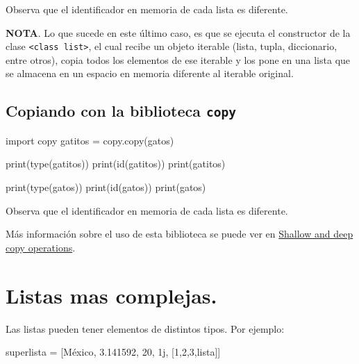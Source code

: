\documentclass[
  letterpaper,
  DIV=11,
  numbers=noendperiod]{scrreprt}
\newenvironment{Shaded}{\begin{snugshade}}{\end{snugshade}}
\newcommand{\BuiltInTok}[1]{\textcolor[rgb]{0.00,0.23,0.31}{#1}}
\newcommand{\DecValTok}[1]{\textcolor[rgb]{0.68,0.00,0.00}{#1}}
\newcommand{\FloatTok}[1]{\textcolor[rgb]{0.68,0.00,0.00}{#1}}
\newcommand{\ImportTok}[1]{\textcolor[rgb]{0.00,0.46,0.62}{#1}}
\newcommand{\NormalTok}[1]{\textcolor[rgb]{0.00,0.23,0.31}{#1}}
\newcommand{\OperatorTok}[1]{\textcolor[rgb]{0.37,0.37,0.37}{#1}}
\newcommand{\OtherTok}[1]{\textcolor[rgb]{0.00,0.23,0.31}{#1}}
\newcommand{\StringTok}[1]{\textcolor[rgb]{0.13,0.47,0.30}{#1}}
\begin{document}
Observa que el identificador en memoria de cada lista es diferente.

\textbf{NOTA}. Lo que sucede en este último caso, es que se ejecuta el
constructor de la clase
\texttt{\textless{}class\ \textquotesingle{}list\textquotesingle{}\textgreater{}},
el cual recibe un objeto iterable (lista, tupla, diccionario, entre
otros), copia todos los elementos de ese iterable y los pone en una
lista que se almacena en un espacio en memoria diferente al iterable
original.

\subsection{\texorpdfstring{Copiando con la biblioteca
\texttt{copy}}{Copiando con la biblioteca copy}}\label{copiando-con-la-biblioteca-copy}

\begin{Shaded}
\begin{Highlighting}[]
\ImportTok{import}\NormalTok{ copy}
\NormalTok{gatitos }\OperatorTok{=}\NormalTok{ copy.copy(gatos)}
\end{Highlighting}
\end{Shaded}

\begin{Shaded}
\begin{Highlighting}[]
\BuiltInTok{print}\NormalTok{(}\BuiltInTok{type}\NormalTok{(gatitos))}
\BuiltInTok{print}\NormalTok{(}\BuiltInTok{id}\NormalTok{(gatitos))}
\BuiltInTok{print}\NormalTok{(gatitos)}

\BuiltInTok{print}\NormalTok{(}\BuiltInTok{type}\NormalTok{(gatos))}
\BuiltInTok{print}\NormalTok{(}\BuiltInTok{id}\NormalTok{(gatos))}
\BuiltInTok{print}\NormalTok{(gatos)}
\end{Highlighting}
\end{Shaded}

Observa que el identificador en memoria de cada lista es diferente.

Más información sobre el uso de esta biblioteca se puede ver en
\href{https://docs.python.org/3/library/copy.html}{Shallow and deep copy
operations}.

\section{Listas mas complejas.}\label{listas-mas-complejas.}

Las listas pueden tener elementos de distintos tipos. Por ejemplo:

\begin{Shaded}
\begin{Highlighting}[]
\NormalTok{superlista }\OperatorTok{=}\NormalTok{ [}\StringTok{\textquotesingle{}México\textquotesingle{}}\NormalTok{, }\FloatTok{3.141592}\NormalTok{, }\DecValTok{20}\NormalTok{, }\OtherTok{1j}\NormalTok{, [}\DecValTok{1}\NormalTok{,}\DecValTok{2}\NormalTok{,}\DecValTok{3}\NormalTok{,}\StringTok{\textquotesingle{}lista\textquotesingle{}}\NormalTok{]]}
\end{Highlighting}
\end{Shaded}
\end{document}
